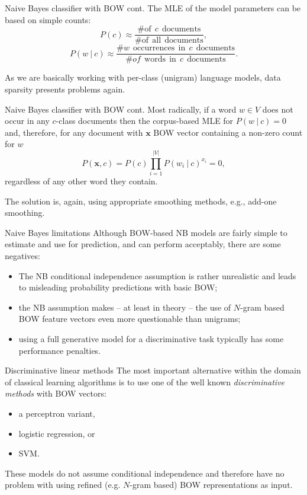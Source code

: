 \documentclass[style=upen, size=14pt]{powerdot}
\theoremstyle{definition}
\begin{document}
 \begin{slide}[toc=]{Naive Bayes classifier with BOW cont.}
   The MLE of the model parameters can be based on simple counts:
   $$
   P(c) \approx \frac{\# \mathrm{of}~~c~~\mathrm{documents}}{ \# \mathrm{of~~all~~documents}},
   $$
   $$
   P(w~|~c) \approx \frac{\# w~~\mathrm{occurrences~~in}~~c~~\mathrm{documents}}{\# of~~\mathrm{words~~in}~~c~~\mathrm{documents}}.
   $$\smallskip
   
   As we are basically working with per-class (unigram) language models, data
   sparsity presents problems again.
 \end{slide}

 \begin{slide}[toc=]{Naive Bayes classifier with BOW cont.}
   Most radically, if a word $w\in V$ does not occur in any $c$-class documents
   then the corpus-based MLE for $P(w~|~c)=0$ and, therefore, for any document
   with $\mathbf{x}$ BOW vector containing a non-zero count for  $w$
   $$
   P(\mathbf{x}, c) = P(c) \prod_{i=1}^{|V|}P(w_i~\vert~c)^{x_i}=0,
   $$
   regardless of any other word they contain.

   The solution is, again, using appropriate smoothing methods, e.g., add-one
   smoothing.
 \end{slide}

 \begin{slide}[toc=]{Naive Bayes limitations}
   Although BOW-based NB models are fairly simple to estimate and use for
   prediction, and can perform acceptably, there are some negatives:
   \begin{itemize}
   \item The NB conditional independence assumption is rather unrealistic and
     leads to misleading probability predictions with basic BOW;
   \item the NB assumption makes -- at least in theory -- the use of $N$-gram
     based BOW feature vectors even more questionable than unigrams;
   \item using a full generative model for a discriminative task typically has
     some performance penalties.
   \end{itemize}
 \end{slide}

 \begin{slide}[toc=Discriminative methods]{Discriminative linear methods}
   The most important alternative within the domain of classical learning
   algorithms is to use one of the well known \emph{discriminative methods} with
   BOW vectors:
   \begin{itemize}
   \item a perceptron variant,
   \item logistic regression, or  
   \item SVM.
   \end{itemize}
   These models do not assume conditional independence and therefore have no
   problem with using refined (e.g. $N$-gram based) BOW representations as input.
 \end{slide}
\end{document}
